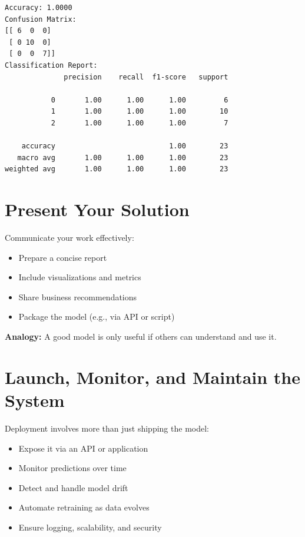\documentclass[
  letterpaper,
  DIV=11,
  numbers=noendperiod]{scrreprt}
\providecommand{\tightlist}{%
  \setlength{\itemsep}{0pt}\setlength{\parskip}{0pt}}\usepackage{longtable,booktabs,array}
\begin{document}
\begin{verbatim}
Accuracy: 1.0000
Confusion Matrix:
[[ 6  0  0]
 [ 0 10  0]
 [ 0  0  7]]
Classification Report:
              precision    recall  f1-score   support

           0       1.00      1.00      1.00         6
           1       1.00      1.00      1.00        10
           2       1.00      1.00      1.00         7

    accuracy                           1.00        23
   macro avg       1.00      1.00      1.00        23
weighted avg       1.00      1.00      1.00        23
\end{verbatim}

\section{Present Your Solution}\label{present-your-solution}

Communicate your work effectively:

\begin{itemize}
\tightlist
\item
  Prepare a concise report\\
\item
  Include visualizations and metrics\\
\item
  Share business recommendations\\
\item
  Package the model (e.g., via API or script)
\end{itemize}

\textbf{Analogy:} A good model is only useful if others can understand
and use it.

\section{Launch, Monitor, and Maintain the
System}\label{launch-monitor-and-maintain-the-system}

Deployment involves more than just shipping the model:

\begin{itemize}
\tightlist
\item
  Expose it via an API or application\\
\item
  Monitor predictions over time\\
\item
  Detect and handle model drift\\
\item
  Automate retraining as data evolves\\
\item
  Ensure logging, scalability, and security
\end{itemize}
\end{document}
